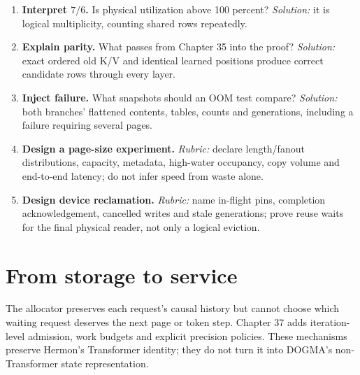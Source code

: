 \begin{enumerate}
\emph{Solution:} no; enforce tenant/trust-domain policy first.
\item \textbf{Interpret $7/6$.} Is physical utilization above 100 percent?
\emph{Solution:} it is logical multiplicity, counting shared rows repeatedly.
\item \textbf{Explain parity.} What passes from Chapter 35 into the proof?
\emph{Solution:} exact ordered old K/V and identical learned positions
produce correct candidate rows through every layer.
\item \textbf{Inject failure.} What snapshots should an OOM test compare?
\emph{Solution:} both branches' flattened contents, tables, counts and
generations, including a failure requiring several pages.
\item \textbf{Design a page-size experiment.} \emph{Rubric:} declare
length/fanout distributions, capacity, metadata, high-water occupancy,
copy volume and end-to-end latency; do not infer speed from waste alone.
\item \textbf{Design device reclamation.} \emph{Rubric:} name in-flight
pins, completion acknowledgement, cancelled writes and stale generations;
prove reuse waits for the final physical reader, not only a logical eviction.
\end{enumerate}

\section{From storage to service}
The allocator preserves each request's causal history but cannot choose
which waiting request deserves the next page or token step. Chapter 37
adds iteration-level admission, work budgets and explicit precision
policies. These mechanisms preserve Hermon's Transformer identity;
they do not turn it into DOGMA's non-Transformer state representation.
